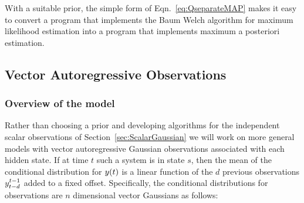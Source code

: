 With a suitable prior, the simple form of Eqn.~\eqref{eq:QseparateMAP}
makes it easy to convert a program that implements the Baum Welch
algorithm for  maximum likelihood
estimation into a program that implements maximum a posteriori
estimation.

\subsection{Vector Autoregressive Observations}
\label{sec:ARVGaussian}

\subsubsection{Overview of the model}

Rather than choosing a prior and developing algorithms for the
independent scalar observations of Section~\ref{sec:ScalarGaussian} we will
work on more general models with vector autoregressive Gaussian
observations associated with each hidden state.  If at time $t$ such a
system is in state $s$, then the mean of the conditional distribution
for ${y}{(t)}$ is a linear function of the $d$ previous observations
$y_{t-d}^{t-1}$ added to a fixed offset.  Specifically, the
conditional distributions for observations are $n$ dimensional vector
Gaussians as follows:
